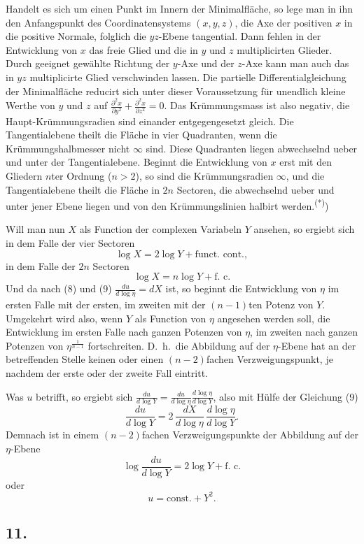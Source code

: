\documentclass[12pt,a4paper]{article}
\begin{document}
Handelt es sich um einen Punkt im Innern der Minimalfl\"ache, so lege man in ihn den Anfangspunkt des Coordinatensystems $(x,y,z)$, die Axe der positiven $x$ in die positive Normale, folglich die $yz$-Ebene tangential. Dann fehlen in der Entwicklung von $x$ das freie Glied und die in $y$ und $z$ multiplicirten Glieder. Durch geeignet gew\"ahlte Richtung der $y$-Axe und der $z$-Axe kann man auch das in $yz$ multiplicirte Glied verschwinden lassen. Die partielle Differentialgleichung der Minimalfl\"ache reducirt sich unter dieser Voraussetzung f\"ur unendlich kleine Werthe von $y$ und $z$ auf $\frac{\partial^{2}x}{\partial y^{2}} + \frac{\partial^{2}x}{\partial z^{2}} = 0$. Das Kr\"ummungsmass ist also negativ, die Haupt-Kr\"ummungsradien sind einander entgegengesetzt gleich. Die Tangentialebene theilt die Fl\"ache in vier Quadranten, wenn die Kr\"ummungshalbmesser nicht $\infty$ sind. Diese Quadranten liegen abwechselnd ueber und unter der Tangentialebene. Beginnt die Entwicklung von $x$ erst mit den Gliedern $n$ter Ordnung ($n>2$), so sind die Kr\"ummungsradien $\infty$, und die Tangentialebene theilt die Fl\"ache in $2n$ Sectoren, die abwechselnd ueber und unter jener Ebene liegen und von den Kr\"ummungslinien halbirt werden.\textsuperscript{(*)})

Will man nun $X$ als Function der complexen Variabeln $Y$ ansehen, so ergiebt sich in dem Falle der vier Sectoren
\[\log X = 2\log Y + \text{funct.\ cont.},\]
in dem Falle der $2n$ Sectoren
\[\log X = n\log Y + \text{f.\ c.}\]
Und da nach (8) und (9) $\frac{du}{d\log\eta} = dX$ ist, so beginnt die Entwicklung von $\eta$ im ersten Falle mit der ersten, im zweiten mit der $(n-1)$ten Potenz von $Y$. Umgekehrt wird also, wenn $Y$ als Function von $\eta$ angesehen werden soll, die Entwicklung im ersten Falle nach ganzen Potenzen von $\eta$, im zweiten nach ganzen Potenzen von $\eta^{\frac{1}{n-1}}$ fortschreiten. D.\ h.\ die Abbildung auf der $\eta$-Ebene hat an der betreffenden Stelle keinen oder einen $(n-2)$fachen Verzweigungspunkt, je nachdem der erste oder der zweite Fall eintritt.

\newpage
Was $u$ betrifft, so ergiebt sich $\frac{du}{d\log Y} = \frac{du}{d\log\eta} \frac{d\log\eta}{d\log Y}$, also mit H\"ulfe der Gleichung (9)
\[\frac{du}{d\log Y} = 2\, \frac{dX}{d\log\eta}\, \frac{d\log\eta}{d\log Y}.\]
Demnach ist in einem $(n-2)$fachen Verzweigungspunkte der Abbildung auf der $\eta$-Ebene
\[\log \frac{du}{d\log Y} = 2\log Y + \text{f.\ c.}\]
oder
\[u = \text{const.} + Y^{2}.\]

\subsection*{11.}
\end{document}
